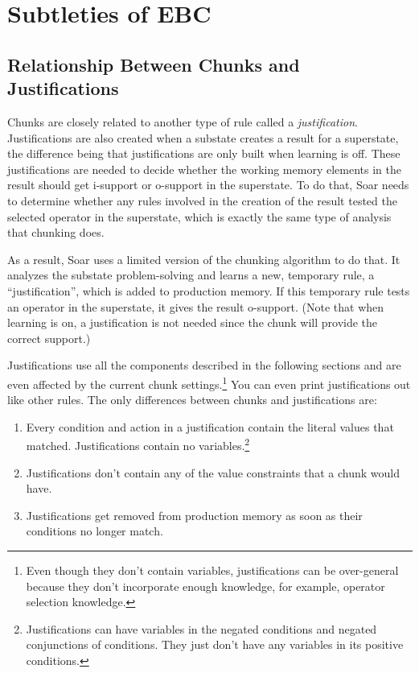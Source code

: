 \section{Subtleties of EBC}
\label{CHUNKING-subtleties}

\subsection{Relationship Between Chunks and Justifications}

Chunks are closely related to another type of rule called a \textit{justification}.  Justifications are also created when a substate creates a result for a superstate, the difference being that justifications are only built when learning is off.  These justifications are needed to decide whether the working memory elements in the result should get i-support or o-support in the superstate.  To do that, Soar needs to determine whether any rules involved in the creation of the result tested the selected operator in the superstate, which is exactly the same type of analysis that chunking does.

As a result, Soar uses a limited version of the chunking algorithm to do that.  It analyzes the substate problem-solving and learns a new, temporary rule, a ``justification'', which is added to production memory.  If this temporary rule tests an operator in the superstate, it gives the result o-support. (Note that when learning is on, a justification is not needed since the chunk will provide the correct support.)

Justifications use all the components described in the following sections and are even affected by the current chunk settings.\footnote{
	Even though they don't contain variables, justifications can be over-general because they don't incorporate enough knowledge, for example, operator selection knowledge.}
 You can even print justifications out like other rules.  The only differences between chunks and justifications are:
 
 \begin{enumerate}
	\item Every condition and action in a justification contain the literal values that matched.  Justifications contain no variables.\footnote{
		Justifications can have variables in the negated conditions and negated conjunctions of conditions.  They just don't have any variables in its positive conditions.}
	\item Justifications don't contain any of the value constraints that a chunk would have.
	\item Justifications get removed from production memory as soon as their conditions no longer match. 
 \end{enumerate}


